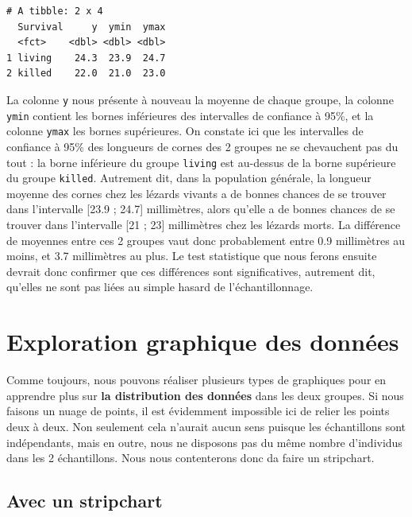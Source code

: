 \documentclass[
  a4paper,
  DIV=11,
  numbers=noendperiod,
  oneside]{scrreprt}
\begin{document}
\begin{verbatim}
# A tibble: 2 x 4
  Survival     y  ymin  ymax
  <fct>    <dbl> <dbl> <dbl>
1 living    24.3  23.9  24.7
2 killed    22.0  21.0  23.0
\end{verbatim}

La colonne \texttt{y} nous présente à nouveau la moyenne de chaque
groupe, la colonne \texttt{ymin} contient les bornes inférieures des
intervalles de confiance à 95\%, et la colonne \texttt{ymax} les bornes
supérieures. On constate ici que les intervalles de confiance à 95\% des
longueurs de cornes des 2 groupes ne se chevauchent pas du tout : la
borne inférieure du groupe \texttt{living} est au-dessus de la borne
supérieure du groupe \texttt{killed}. Autrement dit, dans la population
générale, la longueur moyenne des cornes chez les lézards vivants a de
bonnes chances de se trouver dans l'intervalle {[}23.9 ; 24.7{]}
millimètres, alors qu'elle a de bonnes chances de se trouver dans
l'intervalle {[}21 ; 23{]} millimètres chez les lézards morts. La
différence de moyennes entre ces 2 groupes vaut donc probablement entre
0.9 millimètres au moins, et 3.7 millimètres au plus. Le test
statistique que nous ferons ensuite devrait donc confirmer que ces
différences sont significatives, autrement dit, qu'elles ne sont pas
liées au simple hasard de l'échantillonnage.

\hypertarget{exploration-graphique-des-donnuxe9es-1}{%
\section{Exploration graphique des
données}\label{exploration-graphique-des-donnuxe9es-1}}

Comme toujours, nous pouvons réaliser plusieurs types de graphiques pour
en apprendre plus sur \textbf{la distribution des données} dans les deux
groupes. Si nous faisons un nuage de points, il est évidemment
impossible ici de relier les points deux à deux. Non seulement cela
n'aurait aucun sens puisque les échantillons sont indépendants, mais en
outre, nous ne disposons pas du même nombre d'individus dans les 2
échantillons. Nous nous contenterons donc da faire un stripchart.

\hypertarget{avec-un-stripchart-1}{%
\subsection{Avec un stripchart}\label{avec-un-stripchart-1}}
\end{document}
